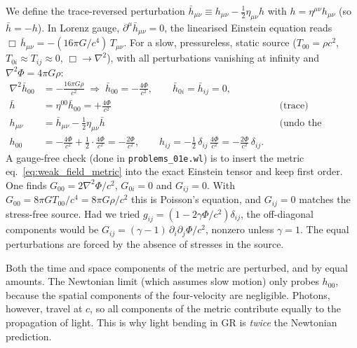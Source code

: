 \begin{derivation}
We define the trace-reversed perturbation
$\bar h_{\mu\nu} \equiv h_{\mu\nu} - \tfrac12\eta_{\mu\nu}h$ with
$h = \eta^{\mu\nu}h_{\mu\nu}$ (so $\bar h = -h$).  In Lorenz gauge,
$\partial^\mu\bar h_{\mu\nu} = 0$, the linearised Einstein equation reads
$\Box\,\bar h_{\mu\nu} = -(16\pi G/c^4)\,T_{\mu\nu}$.
For a slow, pressureless, static source ($T_{00} = \rho c^2$,
$T_{0i} \approx T_{ij} \approx 0$, $\Box \to \nabla^2$), with all
perturbations vanishing at infinity and $\nabla^2\Phi = 4\pi G\rho$:
\begin{align*}
\nabla^2\bar h_{00} &= -\frac{16\pi G\rho}{c^2}
  \;\Rightarrow\; \bar h_{00} = -\frac{4\Phi}{c^2},
  \qquad \bar h_{0i} = \bar h_{ij} = 0 , \\
\bar h &= \eta^{00}\bar h_{00} = +\frac{4\Phi}{c^2}
  && \text{(trace)} \\
h_{\mu\nu} &= \bar h_{\mu\nu} - \tfrac12\eta_{\mu\nu}\bar h
  && \text{(undo the reversal)} \\
h_{00} &= -\frac{4\Phi}{c^2} + \frac12\cdot\frac{4\Phi}{c^2} = -\frac{2\Phi}{c^2},
\qquad
h_{ij} = -\frac12\,\delta_{ij}\,\frac{4\Phi}{c^2} = -\frac{2\Phi}{c^2}\,\delta_{ij} .
\end{align*}
A gauge-free check (done in \texttt{problems\_01e.wl}) is to insert the metric
eq.~\eqref{eq:weak_field_metric} into the exact Einstein tensor and keep
first order.  One finds $G_{00} = 2\nabla^2\Phi/c^2$, $G_{0i} = 0$ and
$G_{ij} = 0$.  With $G_{00} = 8\pi G T_{00}/c^4 = 8\pi G\rho/c^2$ this is
Poisson's equation, and $G_{ij} = 0$ matches the stress-free source.  Had
we tried $g_{ij} = (1 - 2\gamma\Phi/c^2)\delta_{ij}$, the off-diagonal
components would be $G_{ij} = (\gamma - 1)\,\partial_i\partial_j\Phi/c^2$,
nonzero unless $\gamma = 1$.  The equal perturbations are forced by
the absence of stresses in the source.
\end{derivation}


\begin{remark}
Both the time and space components of
the metric are perturbed, and by equal amounts.  The Newtonian limit
(which assumes slow motion) only probes $h_{00}$, because the spatial
components of the four-velocity are negligible.  Photons, however, travel at
$c$, so all components of the metric contribute equally to the
propagation of light.  This is why light bending in GR is
\emph{twice} the Newtonian prediction.
\end{remark}

